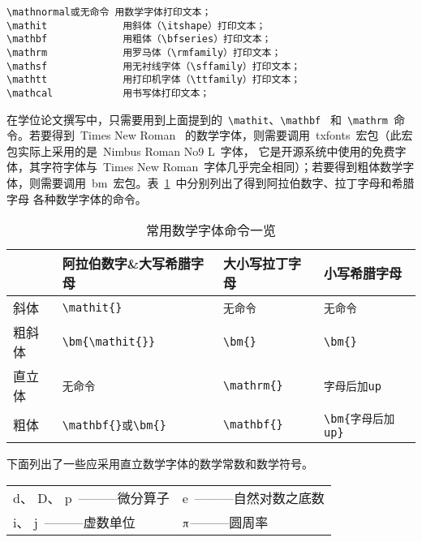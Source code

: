 \begin{verbatim}
\mathnormal或无命令 用数学字体打印文本；
\mathit             用斜体（\itshape）打印文本；
\mathbf             用粗体（\bfseries）打印文本；
\mathrm             用罗马体（\rmfamily）打印文本；
\mathsf             用无衬线字体（\sffamily）打印文本；
\mathtt             用打印机字体（\ttfamily）打印文本；
\mathcal            用书写体打印文本；
\end{verbatim}

在学位论文撰写中，只需要用到上面提到的~\verb|\mathit|、\verb|\mathbf|~ 和~\verb|\mathrm|~命令。若要得到~Times New Roman~ 的数学字体，则需要调用~txfonts~宏包（此宏包实际上采用的是~Nimbus Roman No9 L~字体，
它是开源系统中使用的免费字体，其字符字体与~Times New Roman~字体几乎完全相同）；若要得到粗体数学字体，则需要调用~bm~宏包。表~\ref{tab:fonts}~中分别列出了得到阿拉伯数字、拉丁字母和希腊字母
各种数学字体的命令。

\begin{table}[htbp]
\caption{常用数学字体命令一览}\label{tab:fonts}
\vspace{0.5em}\centering\wuhao
\begin{tabular}{llll}
\toprule
 & 阿拉伯数字\&大写希腊字母 & 大小写拉丁字母 & 小写希腊字母  \\
\midrule
斜体 & \verb|\mathit{}| & \verb|无命令| & \verb|无命令|\\
粗斜体 & \verb|\bm{\mathit{}}| & \verb|\bm{}| & \verb|\bm{}|\\
直立体 & \verb|无命令| & \verb|\mathrm{}| & \verb|字母后加up|\\
粗体 & \verb|\mathbf{}或\bm{}| & \verb|\mathbf{}| & \verb|\bm{字母后加up}|\\
\bottomrule
\end{tabular}
\vspace{\baselineskip}
\end{table}

\noindent 下面列出了一些应采用直立数学字体的数学常数和数学符号。

\vspace{-0.5em}\begin{center}\begin{tabularx}{0.7\textwidth}{XX}
$\mathrm{d}$、 $\mathrm{D}$、 $\mathrm{p}$~———微分算子 & $\mathrm{e}$~———自然对数之底数\\
$\mathrm{i}$、 $\mathrm{j}$~———虚数单位 & $\piup$———圆周率\\
\end{tabularx}\end{center}

